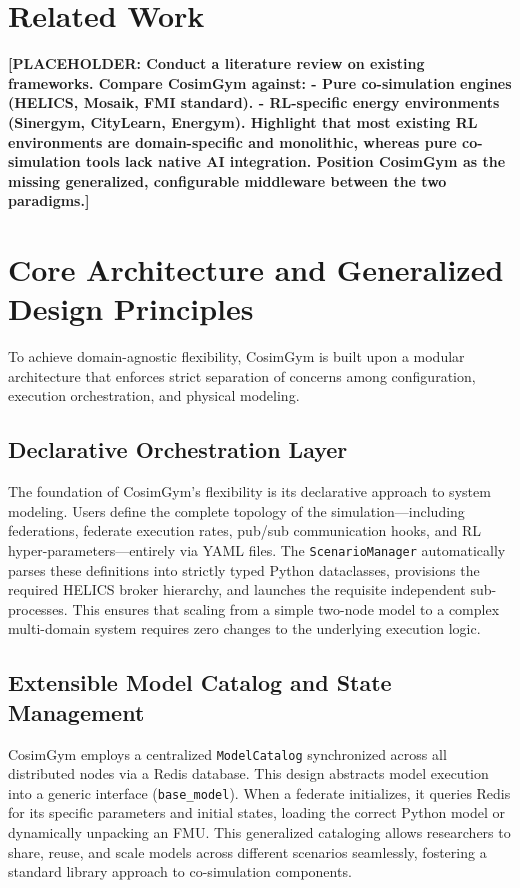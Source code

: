 \section{Related Work}
\textbf{[PLACEHOLDER: Conduct a literature review on existing frameworks. Compare CosimGym against:
- Pure co-simulation engines (HELICS, Mosaik, FMI standard).
- RL-specific energy environments (Sinergym, CityLearn, Energym).
Highlight that most existing RL environments are domain-specific and monolithic, whereas pure co-simulation tools lack native AI integration. Position CosimGym as the missing generalized, configurable middleware between the two paradigms.]}

\section{Core Architecture and Generalized Design Principles}
To achieve domain-agnostic flexibility, CosimGym is built upon a modular architecture that enforces strict separation of concerns among configuration, execution orchestration, and physical modeling.

\subsection{Declarative Orchestration Layer}
The foundation of CosimGym's flexibility is its declarative approach to system modeling. Users define the complete topology of the simulation—including federations, federate execution rates, pub/sub communication hooks, and RL hyper-parameters—entirely via YAML files.
The \texttt{ScenarioManager} automatically parses these definitions into strictly typed Python dataclasses, provisions the required HELICS broker hierarchy, and launches the requisite independent sub-processes. This ensures that scaling from a simple two-node model to a complex multi-domain system requires zero changes to the underlying execution logic.

\subsection{Extensible Model Catalog and State Management}
CosimGym employs a centralized \texttt{ModelCatalog} synchronized across all distributed nodes via a Redis database. This design abstracts model execution into a generic interface (\texttt{base\_model}). 
When a federate initializes, it queries Redis for its specific parameters and initial states, loading the correct Python model or dynamically unpacking an FMU. This generalized cataloging allows researchers to share, reuse, and scale models across different scenarios seamlessly, fostering a standard library approach to co-simulation components.

